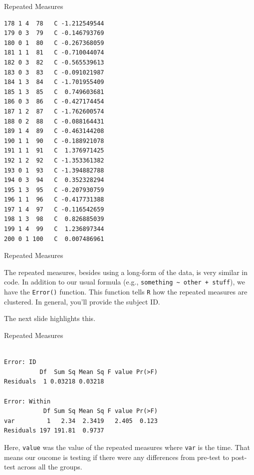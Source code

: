 \begin{frame}[fragile]{Repeated Measures}
\begin{verbatim}
178 1 4  78   C -1.212549544
179 0 3  79   C -0.146793769
180 0 1  80   C -0.267368059
181 1 1  81   C -0.710044074
182 0 3  82   C -0.565539613
183 0 3  83   C -0.091021987
184 1 3  84   C -1.701955409
185 1 3  85   C  0.749603681
186 0 3  86   C -0.427174454
187 1 2  87   C -1.762600574
188 0 2  88   C -0.088164431
189 1 4  89   C -0.463144208
190 1 1  90   C -0.188921078
191 1 1  91   C  1.376971425
192 1 2  92   C -1.353361382
193 0 1  93   C -1.394882788
194 0 3  94   C  0.352328294
195 1 3  95   C -0.207930759
196 1 1  96   C -0.417731388
197 1 4  97   C -0.116542659
198 1 3  98   C  0.826885039
199 1 4  99   C  1.236897344
200 0 1 100   C  0.007486961
\end{verbatim}

\end{frame}

\begin{frame}[fragile]{Repeated Measures}

\Large
The repeated measures, besides using a long-form of the data, is very
similar in code. In addition to our usual formula (e.g.,
\texttt{something\ \textasciitilde{}\ other\ +\ stuff}), we have the
\texttt{Error()} function. This function tells \texttt{R} how the
repeated measures are clustered. In general, you'll provide the subject
ID.

The next slide highlights this.

\end{frame}

\begin{frame}[fragile]{Repeated Measures}

\small

\begin{Shaded}
\begin{Highlighting}[]
\StringTok{ }\OperatorTok{~}\StringTok{ }\OperatorTok{+}\StringTok{ }
\end{Highlighting}
\end{Shaded}

\begin{verbatim}

Error: ID
          Df  Sum Sq Mean Sq F value Pr(>F)
Residuals  1 0.03218 0.03218               

Error: Within
           Df Sum Sq Mean Sq F value Pr(>F)
var         1   2.34  2.3419   2.405  0.123
Residuals 197 191.81  0.9737               
\end{verbatim}

\normalsize
Here, \texttt{value} was the value of the repeated measures where
\texttt{var} is the time. That means our oucome is testing if there were
any differences from pre-test to post-test across all the groups.

\end{frame}

